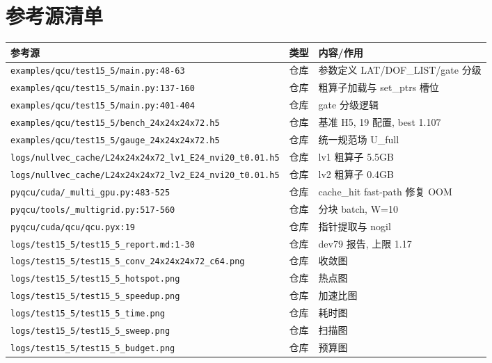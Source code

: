 \documentclass[UTF8]{ctexart}
\begin{document}
\section{参考源清单}
\begin{xltabular}{\textwidth}{llX}
\toprule
\textcolor{evidence}{参考源} & 类型 & 内容/作用 \\
\midrule
\endhead
\texttt{\nolinkurl{examples/qcu/test15_5/main.py:48-63}} & 仓库 & 参数定义 LAT/DOF\_LIST/gate 分级 \\
\texttt{\nolinkurl{examples/qcu/test15_5/main.py:137-160}} & 仓库 & 粗算子加载与 set\_ptrs 槽位 \\
\texttt{\nolinkurl{examples/qcu/test15_5/main.py:401-404}} & 仓库 & gate 分级逻辑 \\
\texttt{\nolinkurl{examples/qcu/test15_5/bench_24x24x24x72.h5}} & 仓库 & 基准 H5, 19 配置, best 1.107 \\
\texttt{\nolinkurl{examples/qcu/test15_5/gauge_24x24x24x72.h5}} & 仓库 & 统一规范场 U\_full \\
\texttt{\nolinkurl{logs/nullvec_cache/L24x24x24x72_lv1_E24_nvi20_t0.01.h5}} & 仓库 & lv1 粗算子 5.5GB \\
\texttt{\nolinkurl{logs/nullvec_cache/L24x24x24x72_lv2_E24_nvi20_t0.01.h5}} & 仓库 & lv2 粗算子 0.4GB \\
\texttt{\nolinkurl{pyqcu/cuda/_multi_gpu.py:483-525}} & 仓库 & cache\_hit fast-path 修复 OOM \\
\texttt{\nolinkurl{pyqcu/tools/_multigrid.py:517-560}} & 仓库 & 分块 batch, W=10 \\
\texttt{\nolinkurl{pyqcu/cuda/qcu/qcu.pyx:19}} & 仓库 & 指针提取与 nogil \\
\texttt{\nolinkurl{logs/test15_5/test15_5_report.md:1-30}} & 仓库 & dev79 报告, 上限 1.17 \\
\texttt{\nolinkurl{logs/test15_5/test15_5_conv_24x24x24x72_c64.png}} & 仓库 & 收敛图 \\
\texttt{\nolinkurl{logs/test15_5/test15_5_hotspot.png}} & 仓库 & 热点图 \\
\texttt{\nolinkurl{logs/test15_5/test15_5_speedup.png}} & 仓库 & 加速比图 \\
\texttt{\nolinkurl{logs/test15_5/test15_5_time.png}} & 仓库 & 耗时图 \\
\texttt{\nolinkurl{logs/test15_5/test15_5_sweep.png}} & 仓库 & 扫描图 \\
\texttt{\nolinkurl{logs/test15_5/test15_5_budget.png}} & 仓库 & 预算图 \\

\end{xltabular}
\end{document}
